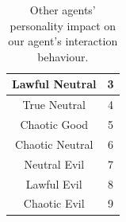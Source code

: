\begin{table}[htb]
\begin{tabular}{ |c|p{16em}|p{16em}| }
        \hline
        Lawful Neutral                    & \multicolumn{2}{c|}{3}                                                                                                                                                                                                                                                                                                               \\
        \hline
        True Neutral                      & \multicolumn{2}{c|}{4}                                                                                                                                                                                                                                                                                                               \\
        \hline
        Chaotic Good                      & \multicolumn{2}{c|}{5}                                                                                                                                                                                                                                                                                                               \\
        \hline
        Chaotic Neutral                   & \multicolumn{2}{c|}{6}                                                                                                                                                                                                                                                                                                               \\
        \hline
        Neutral Evil                      & \multicolumn{2}{c|}{7}                                                                                                                                                                                                                                                                                                               \\
        \hline
        Lawful Evil                       & \multicolumn{2}{c|}{8}                                                                                                                                                                                                                                                                                                               \\
        \hline
        Chaotic Evil                      & \multicolumn{2}{c|}{9}                                                                                                                                                                                                                                                                                                               \\
        \hline
    \end{tabular}
    \caption{Other agents' personality impact on our agent's interaction behaviour.}
    \label{table:personality_impact}
\end{table}

